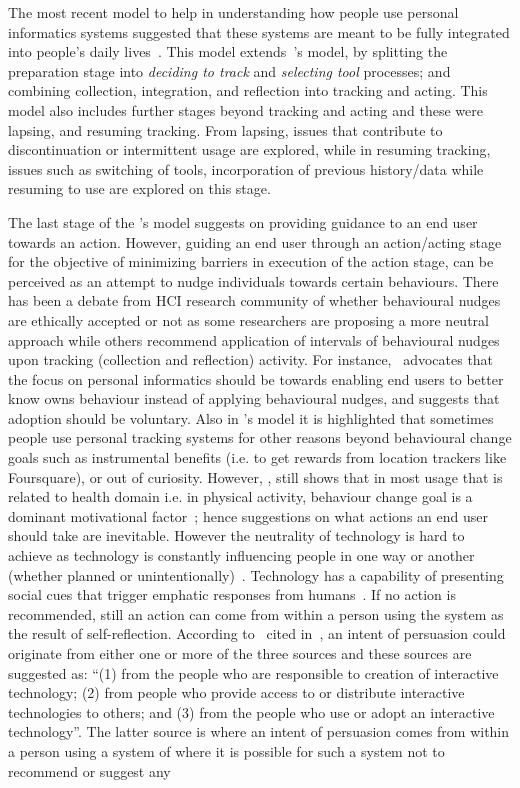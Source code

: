 The most recent model to help in understanding how people use personal informatics systems suggested that these systems are meant to be fully integrated into people's daily lives~\citep{epstein2015lived}. This model extends~\cite{li2010stage}'s model, by splitting the preparation stage into \emph{deciding to track} and \emph{selecting tool} processes; and combining collection, integration, and reflection into tracking and acting. This model also includes further stages beyond tracking and acting and these were lapsing, and resuming tracking.  From lapsing, issues that contribute to discontinuation or intermittent usage are explored, while in resuming tracking, issues such as switching of tools, incorporation of previous history/data while resuming to use are explored on this stage.  

The last stage of the \cite{li2010stage}'s model suggests on providing guidance to an end user towards an action. However, guiding an end user through an action/acting stage for the objective of minimizing barriers in execution of the action stage, can be perceived as an attempt to nudge individuals towards certain behaviours. There has been a debate from HCI research community of whether behavioural nudges are ethically accepted or not as some researchers are proposing a more neutral approach while others recommend application of intervals of behavioural nudges upon tracking (collection and reflection) activity.  For instance,~\cite{munson2012mindfulness} advocates that the focus on personal informatics  should be towards enabling end users to better know owns behaviour instead of applying behavioural nudges, and suggests that adoption should be voluntary. Also in \cite{epstein2015lived}'s model it is highlighted that sometimes people use personal tracking systems for other reasons beyond behavioural change goals such as instrumental benefits (i.e. to get rewards from location trackers like Foursquare), or out of curiosity. However, \cite{epstein2015lived}, still  shows that in most usage that is related to health domain i.e. in physical activity, behaviour change goal is a dominant motivational factor~\citep{epstein2015lived}; hence suggestions on what actions an end user should take are inevitable. However the neutrality of technology is hard to achieve as technology is constantly influencing people in one way or another (whether planned or unintentionally)~\citep{Oinas-kukkonen:psd}. Technology has a capability of presenting social cues that trigger emphatic responses from humans~\citep{foggpersuasivebook}. If no action is recommended, still an action can come from within a person using the system as the result of self-reflection. According to~\cite{fogg1998persuasive} cited in~\cite{Oinas-kukkonen:psd}, an intent of persuasion could originate from either one or more  of the three sources and these sources are suggested as: ``(1) from the people who are responsible to creation of interactive technology; (2) from people who provide access to or distribute interactive technologies to others; and (3) from the people who use or adopt an interactive technology''. The  latter source  is where an intent of persuasion comes from within a person using a system of where it is possible for such a system not to recommend or suggest any 